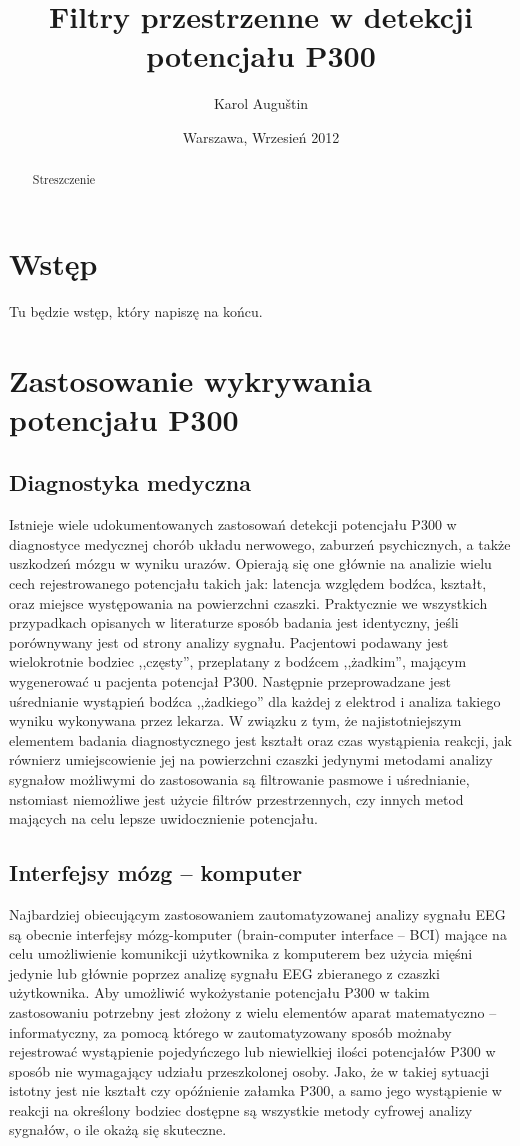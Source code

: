 \documentclass[licencjacka,openright]{pracamgr}
\author{ Karol Auguštin }
\title{ Filtry przestrzenne w detekcji potencjału P300 }
\date{Warszawa, Wrzesień 2012}
\begin{document}
\let\cleardoublepage\clearpage
\maketitle
\begin{abstract}
\par Streszczenie
\end{abstract}
\tableofcontents
\chapter{Wstęp}
Tu będzie wstęp, który napiszę na końcu.

\chapter{Zastosowanie wykrywania potencjału P300}
\section{Diagnostyka medyczna}
Istnieje wiele udokumentowanych zastosowań detekcji potencjału P300 w diagnostyce medycznej chorób układu nerwowego, zaburzeń psychicznych, a także uszkodzeń mózgu w wyniku urazów. \citep{zgorzalewicz2000} Opierają się one głównie na analizie wielu cech rejestrowanego potencjału takich jak: latencja względem bodźca, kształt, oraz miejsce występowania na powierzchni czaszki. Praktycznie we wszystkich przypadkach opisanych w literaturze sposób badania jest identyczny, jeśli porównywany jest od strony analizy sygnału. Pacjentowi podawany jest wielokrotnie bodziec ,,częsty'', przeplatany z bodźcem ,,żadkim'', mającym wygenerować u pacjenta potencjał P300. Następnie przeprowadzane jest uśrednianie wystąpień bodźca ,,żadkiego'' dla każdej z elektrod i analiza takiego wyniku wykonywana przez lekarza. W związku z tym, że najistotniejszym elementem badania diagnostycznego jest kształt oraz czas wystąpienia reakcji, jak równierz umiejscowienie jej na powierzchni czaszki jedynymi metodami analizy sygnałow możliwymi do zastosowania są filtrowanie pasmowe i uśrednianie, nstomiast niemożliwe jest użycie filtrów przestrzennych, czy innych metod mających na celu lepsze uwidocznienie potencjału.
\section{Interfejsy mózg -- komputer}
Najbardziej obiecującym zastosowaniem zautomatyzowanej analizy sygnału EEG są obecnie interfejsy mózg-komputer (brain-computer interface -- BCI) mające na celu umożliwienie komunikcji użytkownika z komputerem bez użycia mięśni jedynie lub głównie poprzez analizę sygnału EEG zbieranego z czaszki użytkownika. Aby umożliwić wykożystanie potencjału P300 w takim zastosowaniu potrzebny jest złożony z wielu elementów aparat matematyczno -- informatyczny, za pomocą którego w zautomatyzowany sposób możnaby rejestrować wystąpienie pojedyńczego lub niewielkiej ilości potencjałów P300 w sposób nie wymagający udziału przeszkolonej osoby. Jako, że w takiej sytuacji istotny jest nie kształt czy opóźnienie załamka P300, a samo jego wystąpienie w reakcji na określony bodziec dostępne są wszystkie metody cyfrowej analizy sygnałów, o ile okażą się skuteczne.
\end{document}
